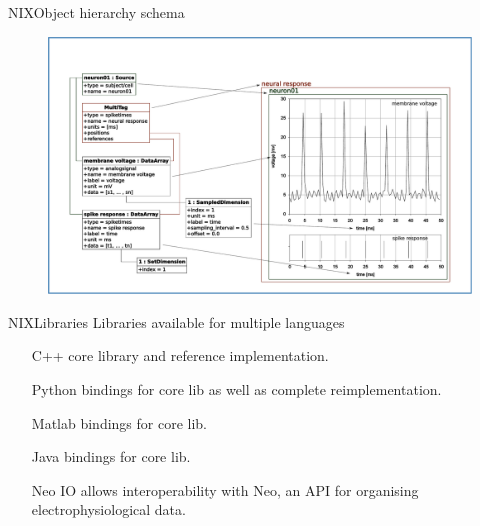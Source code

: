 \documentclass[10pt]{beamer}
\begin{document}
\begin{frame}{NIX}{Object hierarchy schema}
    \begin{figure}
        \includegraphics[width=\textwidth]{nix-model.pdf}
    \end{figure}
\end{frame}

\begin{frame}{NIX}{Libraries}
    Libraries available for multiple languages

    \begin{itemize}
        \item[C++] core library and reference implementation.
        \item[Python] bindings for core lib as well as complete reimplementation.
        \item[Matlab] bindings for core lib.
        \item[Java] bindings for core lib.
    \end{itemize}
    \begin{itemize}
        \item[Neo IO] allows interoperability with Neo, an API for organising electrophysiological data.
    \end{itemize}
\end{frame}
\end{document}
